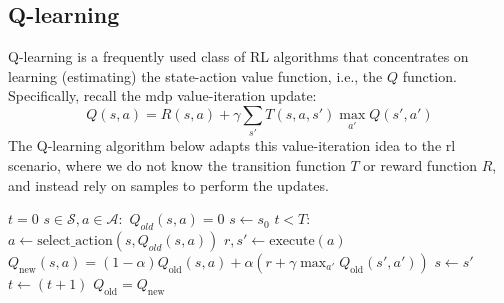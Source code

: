 \subsection{Q-learning}\label{sec-q_learning}
Q-learning is a frequently used class of RL algorithms that
concentrates on learning (estimating) the state-action value function, i.e.,
the $Q$ function. Specifically, recall the {\sc mdp} value-iteration update:
\begin{equation}
  Q(s,a) = R(s,a) + \gamma \sum_{s'} T(s,a,s')\max_{a'}Q(s',a')
\end{equation}
The Q-learning algorithm below adapts this value-iteration idea to the
  {\sc rl} scenario, where we do not know the transition function $T$ or
reward function $R$, and instead rely on samples to perform the updates.
\begin{codebox}
  \label{proc:Q_learn}
  \li $t=0$ 
  \li \For $s \in \mathcal{S}, a \in \mathcal{A}:$
  \li   \Do
  ${Q_{old}}(s, a) = 0$
  \End
  \li $s \gets s_0$
  \li \While $t < T$:
  \li \Do
  $a \gets \text{select}\_\text{action}(s, {Q_{old}}(s, a))$
  \li     $r,s' \gets \text{execute}(a)$
  \li     ${Q}_{\text{new}}(s, a) = (1-\alpha){Q}_{\text{old}}(s, a)
    + \alpha(r + \gamma \max_{a'}{Q}_{\text{old}}(s', a'))$
  \li $s \gets s'$
  \li $t \gets (t+1)$
  \End
  \li      $Q_{\text{old}} = Q_{\text{new}}$
  \End
\end{codebox}

